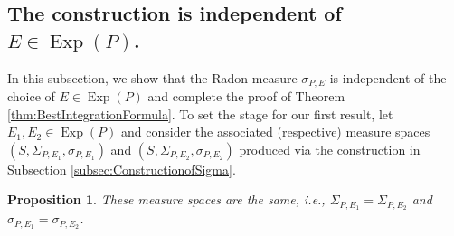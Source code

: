 \documentclass[11pt]{article}
\newtheorem{proposition}[theorem]{Proposition}
\newcommand\Exp{\operatorname{Exp}}
\begin{document}
\subsection{The construction is independent of $E\in\Exp(P)$.}\label{subsec:IndependentofE}

\noindent In this subsection, we show that the Radon measure $\sigma_{P,E}$ is independent of the choice of $E\in\Exp(P)$ and complete the proof of Theorem \ref{thm:BestIntegrationFormula}. To set the stage for our first result, let $E_1,E_2\in\Exp(P)$ and consider the associated (respective) measure spaces $(S,\Sigma_{P,E_1},\sigma_{P,E_1})$ and $(S,\Sigma_{P,E_2},\sigma_{P,E_2})$ produced via the construction in Subsection \ref{subsec:ConstructionofSigma}. 

\begin{proposition}\label{prop:Endependence}
These measure spaces are the same, i.e., $\Sigma_{P,E_1}=\Sigma_{P,E_2}$ and $\sigma_{P,E_1}=\sigma_{P,E_2}$.
\end{proposition}
\end{document}
